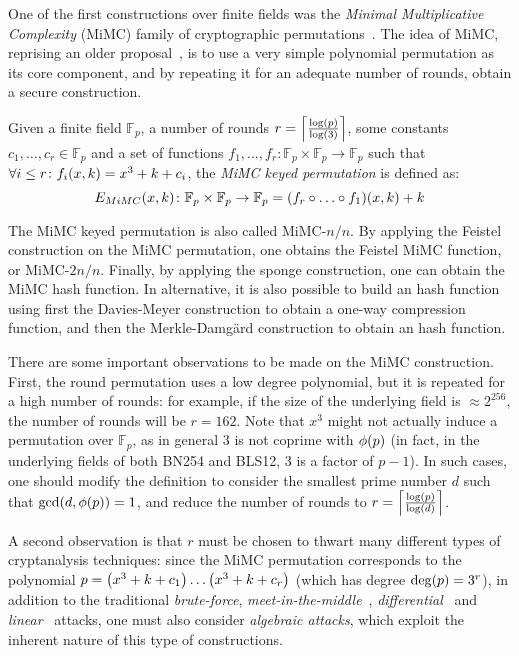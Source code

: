 One of the first constructions over finite fields was the \emph{Minimal Multiplicative Complexity}
(MiMC) family of cryptographic permutations~\cite{AlbrechtGRRT2016}.
The idea of MiMC, reprising an older proposal~\cite{NybergK1995}, is to use a very simple 
polynomial permutation as its core component, and by repeating it for an adequate number of rounds,
obtain a secure construction.
\begin{definition}
  Given a finite field \(\mathbb{F}_p\), a number of rounds 
  \(r = \Ceil*{\frac{\call{\log}{p}}{\call{\log}{3}}}\), some constants 
  \(c_1, \dots, c_r \in \mathbb{F}_p\) and a set of functions 
  \(f_1, \dots, f_r\colon \mathbb{F}_p \times \mathbb{F}_p \to \mathbb{F}_p\) such that 
  \(\forall i \le r\colon \call{f_i}{x, k} = x^3 + k + c_i\), the \emph{MiMC keyed permutation}
  is defined as:
  \[
    \call{E_{MiMC}}{x, k}\colon \mathbb{F}_p \times \mathbb{F}_p \to \mathbb{F}_p = 
    \call{\Parens*{f_r \compose \dots \compose f_1}}{x, k} + k
  \]
\end{definition}

The MiMC keyed permutation is also called MiMC-\(n/n\). 
By applying the Feistel construction on the MiMC permutation, one obtains the Feistel MiMC function, 
or MiMC-\(2n/n\).
Finally, by applying the sponge construction, one can obtain the MiMC hash function.
In alternative, it is also possible to build an hash function using first the Davies-Meyer 
construction to obtain a one-way compression function, and then the Merkle-Damg\"{a}rd construction
to obtain an hash function.

There are some important observations to be made on the MiMC construction.
First, the round permutation uses a low degree polynomial, but it is repeated for a high number of 
rounds: for example, if the size of the underlying field is \(\approx 2^{256}\), the number of 
rounds will be \(r = 162\). 
Note that \(x^3\) might not actually induce a permutation over \(\mathbb{F}_p\), as in general 
\(3\) is not coprime with \(\call{\totient}{p}\) (in fact, in the underlying fields of both BN254 
and BLS12, \(3\) is a factor of \(p - 1\)).
In such cases, one should modify the definition to consider the smallest prime number \(d\) such 
that \(\call{\gcd}{d, \call{\totient}{p}} = 1\), and reduce the number of rounds to
\(r = \Ceil*{\frac{\call{\log}{p}}{\call{\log}{d}}}\).

A second observation is that \(r\) must be chosen to thwart many different types of cryptanalysis 
techniques: since the MiMC permutation corresponds to the 
polynomial \(p = \Parens*{x^3 + k + c_1}\dots\Parens*{x^3 + k + c_r}\) 
(which has degree \(\call{\deg}{p} = 3^r\)), in addition to the traditional \emph{brute-force}, 
\emph{meet-in-the-middle}~\cite{DiffieH1977}, \emph{differential}~\cite{BihamS1991} and 
\emph{linear}~\cite{Matsui1994} attacks, one must also consider \emph{algebraic attacks}, 
which exploit the inherent nature of this type of constructions.

